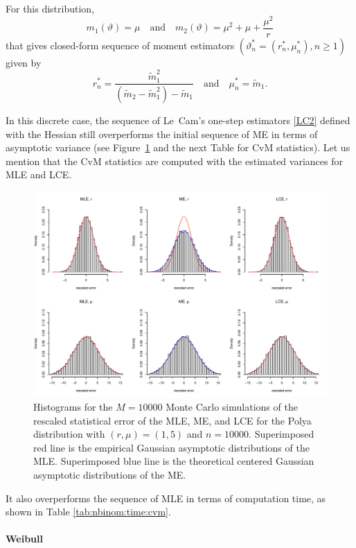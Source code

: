 For this distribution, 
$$ m_1(\vartheta)= \mu \quad  \mbox{and} \quad  m_2(\vartheta) = \mu^2 +\mu + \frac{\mu^2}{r}$$
that gives closed-form sequence of moment estimators $(\vartheta^*_n=(r^*_n,\mu^*_n), n \geq1)$ given by
$$ r_n^*= \frac{\tilde{m}_1^2}{(\tilde{m}_2-\tilde{m}_1^2)-\tilde{m}_1} \quad  \mbox{and}  \quad \mu_n^*=\tilde{m}_1.$$


In this discrete case, the sequence of Le~Cam's one-step estimators \eqref{LC2} defined with the Hessian still overperforms the initial sequence of ME in terms of asymptotic variance (see Figure~\ref{fig:polya} and the next Table for CvM statistics). Let us mention that the CvM statistics are computed with the estimated variances for MLE and LCE.

\begin{figure}[ht]
\centering
\includegraphics[width=\textwidth]{fig-nbinom.pdf}
\caption{Histograms for the $M=10000$ Monte Carlo simulations of the rescaled statistical error of the MLE, ME, and LCE for the Polya distribution with $(r,\mu)=(1,5)$ and $n=10000$. Superimposed red line is the empirical Gaussian asymptotic distributions of the MLE. Superimposed blue line is the theoretical centered Gaussian asymptotic distributions of the ME.}\label{fig:polya}
\end{figure}

It also overperforms the sequence of MLE in terms of computation time, as shown in Table \ref{tab:nbinom:time:cvm}. 




\paragraph{Weibull}

